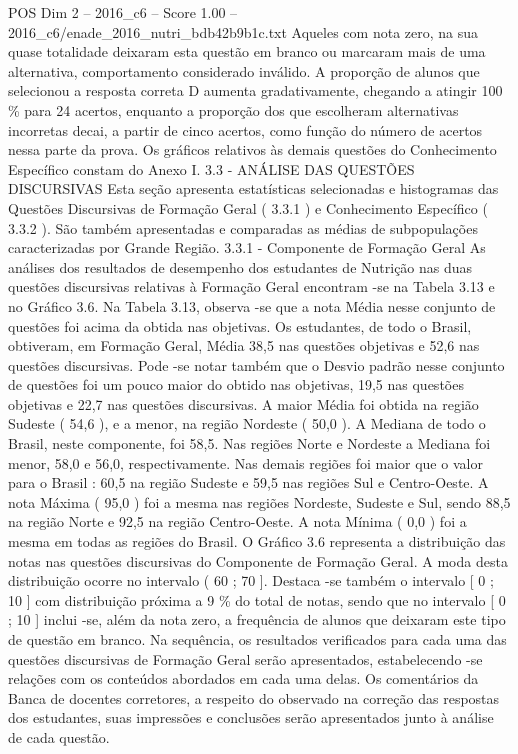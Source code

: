 \begin{textsample}{POS Dim 2 – 2016\_c6 – Score 1.00 – 2016\_c6/enade\_2016\_nutri\_bdb42b9b1c.txt}
Aqueles com nota zero, na sua quase totalidade deixaram esta questão em branco ou marcaram mais de uma alternativa, comportamento considerado inválido.
A proporção de alunos que selecionou a resposta correta D aumenta gradativamente, chegando a atingir 100 \% para 24 acertos, enquanto a proporção dos que escolheram alternativas incorretas decai, a partir de cinco acertos, como função do número de acertos nessa parte da prova.
Os gráficos relativos às demais questões do Conhecimento Específico constam do Anexo I. 3.3 - ANÁLISE DAS QUESTÕES DISCURSIVAS Esta seção apresenta estatísticas selecionadas e histogramas das Questões Discursivas de Formação Geral ( 3.3.1 ) e Conhecimento Específico ( 3.3.2 ).
São também apresentadas e comparadas as médias de subpopulações caracterizadas por Grande Região. 3.3.1 - Componente de Formação Geral As análises dos resultados de desempenho dos estudantes de Nutrição nas duas questões discursivas relativas à Formação Geral encontram -se na Tabela 3.13 e no Gráfico 3.6.
Na Tabela 3.13, observa -se que a nota Média nesse conjunto de questões foi acima da obtida nas objetivas.
Os estudantes, de todo o Brasil, obtiveram, em Formação Geral, Média 38,5 nas questões objetivas e 52,6 nas questões discursivas.
Pode -se notar também que o Desvio padrão nesse conjunto de questões foi um pouco maior do obtido nas objetivas, 19,5 nas questões objetivas e 22,7 nas questões discursivas.
A maior Média foi obtida na região Sudeste ( 54,6 ), e a menor, na região Nordeste ( 50,0 ).
A Mediana de todo o Brasil, neste componente, foi 58,5.
Nas regiões Norte e Nordeste a Mediana foi menor, 58,0 e 56,0, respectivamente.
Nas demais regiões foi maior que o valor para o Brasil : 60,5 na região Sudeste e 59,5 nas regiões Sul e Centro-Oeste.
A nota Máxima ( 95,0 ) foi a mesma nas regiões Nordeste, Sudeste e Sul, sendo 88,5 na região Norte e 92,5 na região Centro-Oeste.
A nota Mínima ( 0,0 ) foi a mesma em todas as regiões do Brasil.
O Gráfico 3.6 representa a distribuição das notas nas questões discursivas do Componente de Formação Geral.
A moda desta distribuição ocorre no intervalo ( 60 ; 70 ].
Destaca -se também o intervalo [ 0 ; 10 ] com distribuição próxima a 9 \% do total de notas, sendo que no intervalo [ 0 ; 10 ] inclui -se, além da nota zero, a frequência de alunos que deixaram este tipo de questão em branco.
Na sequência, os resultados verificados para cada uma das questões discursivas de Formação Geral serão apresentados, estabelecendo -se relações com os conteúdos abordados em cada uma delas.
Os comentários da Banca de docentes corretores, a respeito do observado na correção das respostas dos estudantes, suas impressões e conclusões serão apresentados junto à análise de cada questão.

\end{textsample}

